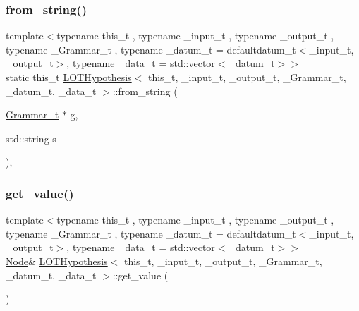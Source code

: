 \subsubsection{\texorpdfstring{from\+\_\+string()}{from\_string()}}
{\footnotesize\ttfamily template$<$typename this\+\_\+t , typename \+\_\+input\+\_\+t , typename \+\_\+output\+\_\+t , typename \+\_\+\+Grammar\+\_\+t , typename \+\_\+datum\+\_\+t  = defaultdatum\+\_\+t$<$\+\_\+input\+\_\+t, \+\_\+output\+\_\+t$>$, typename \+\_\+data\+\_\+t  = std\+::vector$<$\+\_\+datum\+\_\+t$>$$>$ \\
static this\+\_\+t \hyperlink{class_l_o_t_hypothesis}{L\+O\+T\+Hypothesis}$<$ this\+\_\+t, \+\_\+input\+\_\+t, \+\_\+output\+\_\+t, \+\_\+\+Grammar\+\_\+t, \+\_\+datum\+\_\+t, \+\_\+data\+\_\+t $>$\+::from\+\_\+string (\begin{DoxyParamCaption}\item[{\hyperlink{class_l_o_t_hypothesis_a5393058e614835e0f139bd40acb183b2}{Grammar\+\_\+t} $\ast$}]{g,  }\item[{std\+::string}]{s }\end{DoxyParamCaption})\hspace{0.3cm}{\ttfamily [inline]}, {\ttfamily [static]}}

\mbox{\label{class_l_o_t_hypothesis_ac1eb445a699bb8432ddee1052a8d5a58}} 
\subsubsection{\texorpdfstring{get\+\_\+value()}{get\_value()}\hspace{0.1cm}{\footnotesize\ttfamily [1/2]}}
{\footnotesize\ttfamily template$<$typename this\+\_\+t , typename \+\_\+input\+\_\+t , typename \+\_\+output\+\_\+t , typename \+\_\+\+Grammar\+\_\+t , typename \+\_\+datum\+\_\+t  = defaultdatum\+\_\+t$<$\+\_\+input\+\_\+t, \+\_\+output\+\_\+t$>$, typename \+\_\+data\+\_\+t  = std\+::vector$<$\+\_\+datum\+\_\+t$>$$>$ \\
\hyperlink{class_node}{Node}\& \hyperlink{class_l_o_t_hypothesis}{L\+O\+T\+Hypothesis}$<$ this\+\_\+t, \+\_\+input\+\_\+t, \+\_\+output\+\_\+t, \+\_\+\+Grammar\+\_\+t, \+\_\+datum\+\_\+t, \+\_\+data\+\_\+t $>$\+::get\+\_\+value (\begin{DoxyParamCaption}{ }\end{DoxyParamCaption})\hspace{0.3cm}{\ttfamily [inline]}}

